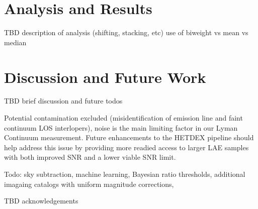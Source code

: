\documentclass{aastex62}
\begin{document}
\section{Analysis and Results} \label{sec:analysis}

TBD description of analysis (shifting, stacking, etc) use of biweight vs mean vs median

\section{Discussion and Future Work} \label{sec:discussion}
TBD brief discussion and future todos

Potential contamination excluded (misidentification of emission line and faint continuum LOS interlopers), noise is the main limiting factor in our Lyman Continuum measurement. Future enhancements to the HETDEX pipeline should help address this issue by providing more readied access to larger LAE samples with both improved SNR and a lower viable SNR limit.

Todo: sky subtraction, machine learning, Bayesian ratio thresholds, additional imagaing catalogs with uniform magnitude corrections, 

\acknowledgments

TBD acknowledgements
\end{document}
